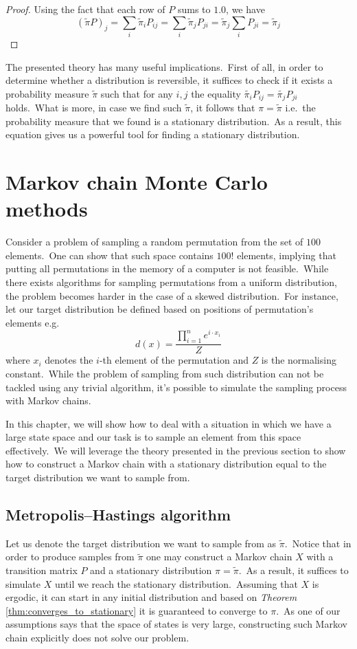 \documentclass[shortabstract, english, lic]{iithesis}
\newcommand\numberedchapter[1]{\setlength\topskip{3cm}\chapter{#1}\setlength\topskip{0cm}}
\theoremstyle{default_theorem_style}\newtheorem{theorem}{Theorem}
\theoremstyle{default_theorem_style}\newtheorem{definition}{Definition}
\begin{document}
\begin{proof}
Using the fact that each row of $P$ sums to $1.0$, we have
$$
(\tilde{\pi} P)_j = \sum\limits_i \tilde{\pi}_i P_{ij} = \sum\limits_i \tilde{\pi}_j P_{ji} =
\tilde{\pi}_j \sum\limits_i P_{ji} = \tilde{\pi}_j
$$
\end{proof}

\noindent The presented theory has many useful implications.\ First of all, in order to determine
whether a distribution is reversible, it suffices to check if it exists a probability measure $\tilde{\pi}$ such that
for any $i, j$ the equality $\tilde{\pi_i} P_{ij} = \tilde{\pi_j} P_{ji}$ holds.\ What is more, in case we find such
$\tilde{\pi}$, it follows that $\pi = \tilde{\pi}$ i.e.\ the probability measure that we found is a stationary
distribution.\ As a result, this equation gives us a powerful tool for finding a stationary distribution.

\numberedchapter{Markov chain Monte Carlo methods}\label{chapter:mcmc}

Consider a problem of sampling a random permutation from the set of $100$ elements.\ One can show that such space
contains $100!$ elements, implying that putting all permutations in the memory of a computer is not feasible.\ While
there exists algorithms for sampling permutations from a uniform distribution, the problem becomes harder in the case of
a skewed distribution.\ For instance, let our target distribution be defined based on positions of permutation's
elements e.g.
$$
d(x) = \frac{\prod_{i = 1}^{n} e^{i \cdot x_i}}{Z}
$$
where $x_i$ denotes the $i$-th element of the permutation and $Z$ is the normalising constant.\ While the problem
of sampling from such distribution can not be tackled using any trivial algorithm, it's possible to simulate the
sampling process with Markov chains.\newline

\noindent In this chapter, we will show how to deal with a situation in which we have a large state space and our
task is to sample an element from this space effectively.\ We will leverage the theory presented in the previous
section to show how to construct a Markov chain with a stationary distribution equal to the target distribution we
want to sample from.

\section{Metropolis–Hastings algorithm}

Let us denote the target distribution we want to sample from as $\tilde{\pi}$.\ Notice that in order to produce samples
from $\tilde{\pi}$ one may construct a Markov chain $X$ with a transition matrix $P$ and a stationary distribution
$\pi = \tilde{\pi}$.\ As a result, it suffices to simulate $X$ until we reach the stationary distribution.\ Assuming
that $X$ is ergodic, it can start in any initial distribution and based on \textit{Theorem} \ref{thm:converges_to_stationary}
it is guaranteed to converge to $\pi$.\ As one of our assumptions says that the space of states is very large,
constructing such Markov chain explicitly does not solve our problem.\newline
\end{document}
